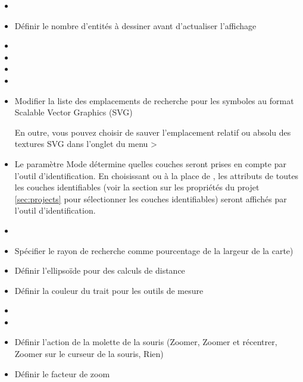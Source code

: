 \begin{itemize}[label=--]
\item {}
\item Définir le nombre d'entités à dessiner avant d'actualiser l'affichage
\item {}
\item {}
\item {}
\item {}
\item Modifier la liste des emplacements de recherche pour les symboles au format Scalable Vector Graphics (SVG)

En outre, vous pouvez choisir de sauver l'emplacement relatif ou absolu des textures SVG dans l'onglet  du menu  > 
\end{itemize}


\begin{itemize}[label=--]
\item Le paramètre Mode détermine quelles couches seront prises en compte par l'outil d'identification. En choisissant  ou  à la place de , les attributs de toutes les couches identifiables (voir la section sur les propriétés du projet \ref{sec:projects} pour sélectionner les couches identifiables) seront affichés par l'outil d'identification.
\item {}
\item Spécifier le rayon de recherche comme pourcentage de la largeur de la carte)
\item Définir l'ellipsoïde pour des calculs de distance
\item Définir la couleur du trait pour les outils de mesure
\item {}
\item {}
\item Définir l'action de la molette de la souris (Zoomer, Zoomer et récentrer, Zoomer sur le curseur de la souris, Rien)
\item Définir le facteur de zoom
\end{itemize}

